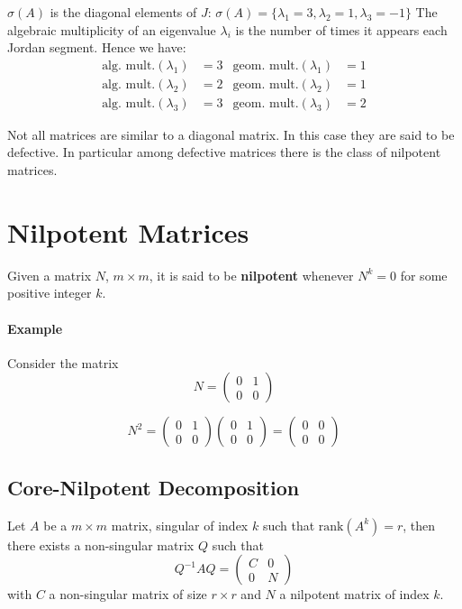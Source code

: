 $\sigma(A)$ is the diagonal elements of $J$: $\sigma(A) = \{\lambda_1 = 3, \lambda_2 = 1, \lambda_3 = -1\}$
The algebraic multiplicity of an eigenvalue $\lambda_i$ is the number of times it appears each Jordan segment.
Hence we have:
\begin{align*}
\text{alg. mult.}(\lambda_1) &= 3 & \text{geom. mult.}(\lambda_1) &= 1 \\
\text{alg. mult.}(\lambda_2) &= 2 & \text{geom. mult.}(\lambda_2) &= 1 \\
\text{alg. mult.}(\lambda_3) &= 3 & \text{geom. mult.}(\lambda_3) &= 2
\end{align*}

Not all matrices are similar to a diagonal matrix. In this case they are said to be defective.
In particular among defective matrices there is the class of nilpotent matrices.
\section{Nilpotent Matrices}
Given a matrix \(N\), \(m \times m\), it is said to be \textbf{nilpotent} whenever \(N^k = 0\) for some positive integer \(k\).

\paragraph{Example}
Consider the matrix
\[
N = \begin{pmatrix}
0 & 1 \\
0 & 0
\end{pmatrix}
\]

\[
N^2 = \begin{pmatrix}
0 & 1 \\
0 & 0
\end{pmatrix}
\begin{pmatrix}
0 & 1 \\
0 & 0
\end{pmatrix}
= \begin{pmatrix}
0 & 0 \\
0 & 0
\end{pmatrix}
\]

\subsection{Core-Nilpotent Decomposition}
Let \( A \) be a \( m \times m \) matrix, singular of index \( k \) such that \( \text{rank}(A^k) = r \), then there exists a non-singular matrix \( Q \) such that
\[
Q^{-1} A Q = \begin{pmatrix}
C & 0 \\
0 & N
\end{pmatrix}
\]
with \( C \) a non-singular matrix of size \( r \times r \) and \( N \) a nilpotent matrix of index \( k \).

